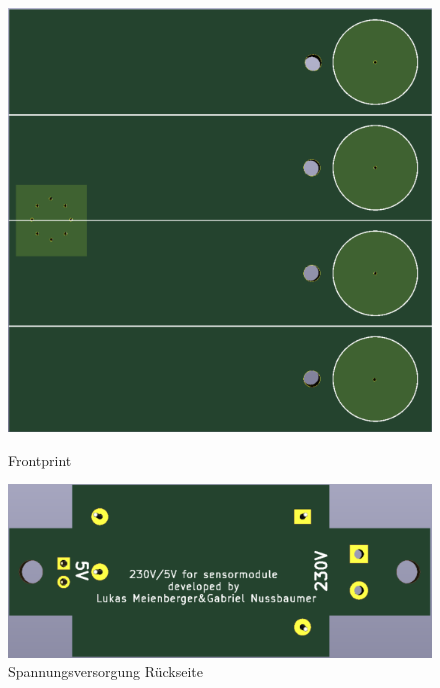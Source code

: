 \begin{figure}[H]
\begin{center}
\begin{minipage}[b]{.3\linewidth}
			\includegraphics[width=\textwidth]{graphics/Sensor3.PNG}
			\caption{Frontprint}
		\end{minipage}
	\hspace{.1\linewidth}%
		\begin{minipage}[b]{.3\linewidth} %
	\includegraphics[width=\textwidth]{graphics/Sensor2.PNG}
	\caption{Spannungsversorgung Rückseite}
\end{minipage}
\end{center}
\end{figure}

